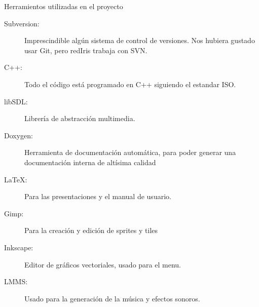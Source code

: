 \documentclass[9pt,xcolor=svgnames]{beamer}
\begin{document}
 \begin{frame}{Herramientos utilizadas en el proyecto}
   \transdissolve
   \begin{description}
   \item[Subversion: ] Imprescindible algún sistema de control de versiones.
     Nos hubiera gustado usar Git, pero redIris trabaja con SVN.
   \item[C++: ] Todo el código está programado en C++ siguiendo el estandar ISO.
   \item[libSDL: ] Librería de abstracción multimedia.
   \item[Doxygen: ] Herramienta de documentación automática, para poder 
     generar una documentación interna de altísima calidad
   \item[\LaTeX : ] Para las presentaciones y el manual de usuario.
   \item[Gimp: ] Para la creación y edición de sprites y tiles
   \item[Inkscape: ] Editor de gráficos vectoriales, usado para el menu.
   \item[LMMS: ] Usado para la generación de la música y efectos sonoros.
   \end{description}
 \end{frame}
 
  

  
\end{document}

